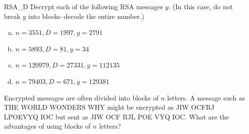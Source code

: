 \begin{exercise}{RSA_D}
Decrypt each of the following RSA messages $y$. (In this case, do not break $y$ into blocks--decode the entire number.)
 
 \begin{enumerate}[(a)]
\item
 $n = 3551, D = 1997, y = 2791$
 \item
$n = 5893, D = 81, y = 34$
 \item
$n = 120979, D = 27331, y = 112135$
 \item
$n = 79403, D = 671, y = 129381$
 \end{enumerate}
 \end{exercise}
 
% 
% 
% 
% 
% 
% 
% 
% 
% 
 
\begin{exercise}{} 
Encrypted messages are often divided into blocks of $n$ letters. A
message such as THE WORLD WONDERS WHY might be encrypted as 
JIW OCFRJ LPOEVYQ IOC but sent as JIW OCF RJL POE VYQ
IOC.  What are the advantages of using blocks of $n$ letters? 
 \end{exercise}
 
